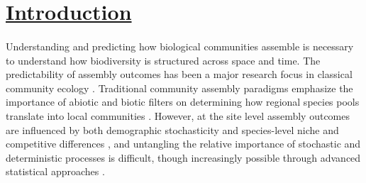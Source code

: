 
\clearpage


\section*{\textbf{\underline{Introduction}}}
\paragraph*{} Understanding and predicting how biological communities assemble is necessary to understand how biodiversity is structured across space and time. The predictability of assembly outcomes has been a major research focus in classical community ecology \parencite{diamond1975assembly,drake1990mechanics, keddy1992assembly, weiher2001ecological,chase2003community, tilman2004niche}. Traditional community assembly paradigms emphasize the importance of abiotic and biotic filters on determining how regional species pools translate into local communities \parencite{weiher2011advances, hillerislambers2012rethinking}. However, at the site level assembly outcomes are influenced by both demographic stochasticity and species-level niche and competitive differences \parencite{tilman2004niche, macdougall2008climatic, martorell2014testing, zhou2017stochastic}, and untangling the relative importance of stochastic and deterministic processes is difficult, though increasingly possible through advanced statistical approaches \parencite{Maynard2020}.


